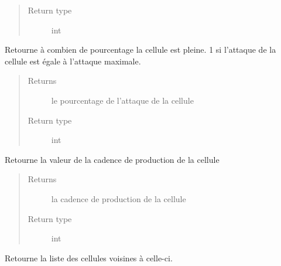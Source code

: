 \documentclass[letterpaper,10pt,english]{sphinxmanual}
\begin{document}
\begin{fulllineitems}
\begin{fulllineitems}
\begin{quote}
\begin{description}
\item[{Return type}] \leavevmode
int

\end{description}\end{quote}

\end{fulllineitems}


\begin{fulllineitems}
\label{index:Cellule.Cellule.getPourcentageAttaque}
Retourne à combien de pourcentage la cellule est pleine.
1 si l'attaque de la cellule est égale à l'attaque maximale.
\begin{quote}\begin{description}
\item[{Returns}] \leavevmode
le pourcentage de l'attaque de la cellule

\item[{Return type}] \leavevmode
int

\end{description}\end{quote}

\end{fulllineitems}


\begin{fulllineitems}
\label{index:Cellule.Cellule.getProduction}
Retourne la valeur de la cadence de production de la cellule
\begin{quote}\begin{description}
\item[{Returns}] \leavevmode
la cadence de production de la cellule

\item[{Return type}] \leavevmode
int

\end{description}\end{quote}

\end{fulllineitems}


\begin{fulllineitems}
\label{index:Cellule.Cellule.getVoisins}
Retourne la liste des cellules voisines à celle-ci.


\end{fulllineitems}
\end{fulllineitems}
\end{document}
